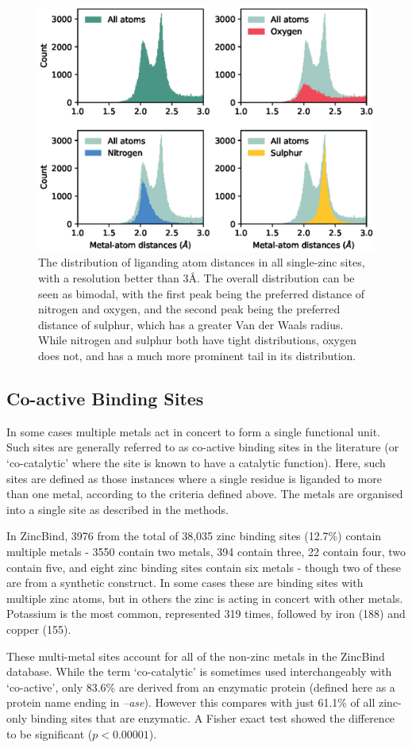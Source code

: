 \begin{figure}
\centering
\includegraphics[width=1.0\textwidth]{Figures/atom-distances.eps}
\caption{\label{fig:atom-distances.eps} The distribution of liganding atom
  distances in all single-zinc sites, with a resolution better than
  3\AA. The overall distribution can be seen as bimodal, with the
  first peak being the preferred distance of nitrogen and oxygen, and
  the second peak being the preferred distance of sulphur, which has a
  greater Van der Waals radius.  While nitrogen and sulphur both have
  tight distributions, oxygen does not, and has a much more prominent
  tail in its distribution.}
\end{figure}

\subsection{Co-active Binding Sites}

In some cases multiple metals act in concert to form a single functional unit. Such sites are generally referred to as co-active binding sites in the literature (or `co-catalytic' where the site is known to have a catalytic function). Here, such sites are defined as those instances where a single residue is liganded to more than one metal, according to the criteria defined above. The metals are organised into a single site as described in the methods.

In ZincBind, 3976 from the total of 38,035 zinc binding sites (12.7\%) contain multiple metals - 3550 contain two metals, 394 contain three, 22 contain four, two contain five, and eight zinc binding sites contain six metals - though two of these are from a synthetic construct. In some cases these are binding sites with multiple zinc atoms, but in others the zinc is acting in concert with other metals. Potassium is the most common, represented 319 times, followed by iron (188) and copper (155).

These multi-metal sites account for all of the non-zinc metals in the ZincBind database. While the term `co-catalytic' is sometimes used interchangeably with `co-active', only 83.6\% are derived from an enzymatic protein (defined here as a protein name ending in \emph{--ase}). However this compares with just 61.1\% of all zinc-only binding sites that are enzymatic. A Fisher exact test showed the difference to be significant ($p<0.00001$).